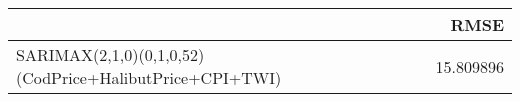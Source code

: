 \begin{tabular}{lr}
\toprule
 & RMSE \\
\midrule
SARIMAX(2,1,0)(0,1,0,52)(CodPrice+HalibutPrice+CPI+TWI) & 15.809896 \\
\bottomrule
\end{tabular}

